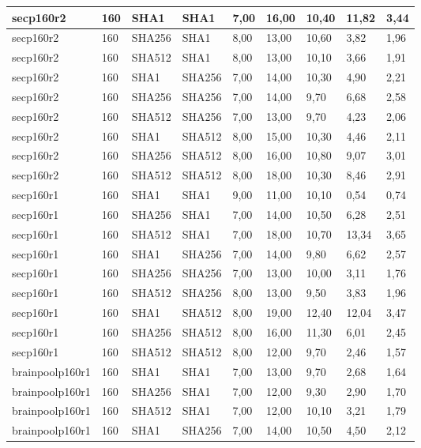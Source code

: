 \begin{longtable}{| l | l | l | l | l |l |l |l |l |}
secp160r2 & 160 & SHA1 & SHA1 & 7,00 & 16,00 & 10,40 & 11,82 & 3,44 \\ \hline 
secp160r2 & 160 & SHA256 & SHA1 & 8,00 & 13,00 & 10,60 & 3,82 & 1,96 \\ \hline 
secp160r2 & 160 & SHA512 & SHA1 & 8,00 & 13,00 & 10,10 & 3,66 & 1,91 \\ \hline 
secp160r2 & 160 & SHA1 & SHA256 & 7,00 & 14,00 & 10,30 & 4,90 & 2,21 \\ \hline 
secp160r2 & 160 & SHA256 & SHA256 & 7,00 & 14,00 & 9,70 & 6,68 & 2,58 \\ \hline 
secp160r2 & 160 & SHA512 & SHA256 & 7,00 & 13,00 & 9,70 & 4,23 & 2,06 \\ \hline 
secp160r2 & 160 & SHA1 & SHA512 & 8,00 & 15,00 & 10,30 & 4,46 & 2,11 \\ \hline 
secp160r2 & 160 & SHA256 & SHA512 & 8,00 & 16,00 & 10,80 & 9,07 & 3,01 \\ \hline 
secp160r2 & 160 & SHA512 & SHA512 & 8,00 & 18,00 & 10,30 & 8,46 & 2,91 \\ \hline 
secp160r1 & 160 & SHA1 & SHA1 & 9,00 & 11,00 & 10,10 & 0,54 & 0,74 \\ \hline 
secp160r1 & 160 & SHA256 & SHA1 & 7,00 & 14,00 & 10,50 & 6,28 & 2,51 \\ \hline 
secp160r1 & 160 & SHA512 & SHA1 & 7,00 & 18,00 & 10,70 & 13,34 & 3,65 \\ \hline 
secp160r1 & 160 & SHA1 & SHA256 & 7,00 & 14,00 & 9,80 & 6,62 & 2,57 \\ \hline 
secp160r1 & 160 & SHA256 & SHA256 & 7,00 & 13,00 & 10,00 & 3,11 & 1,76 \\ \hline 
secp160r1 & 160 & SHA512 & SHA256 & 8,00 & 13,00 & 9,50 & 3,83 & 1,96 \\ \hline 
secp160r1 & 160 & SHA1 & SHA512 & 8,00 & 19,00 & 12,40 & 12,04 & 3,47 \\ \hline 
secp160r1 & 160 & SHA256 & SHA512 & 8,00 & 16,00 & 11,30 & 6,01 & 2,45 \\ \hline 
secp160r1 & 160 & SHA512 & SHA512 & 8,00 & 12,00 & 9,70 & 2,46 & 1,57 \\ \hline 
brainpoolp160r1 & 160 & SHA1 & SHA1 & 7,00 & 13,00 & 9,70 & 2,68 & 1,64 \\ \hline 
brainpoolp160r1 & 160 & SHA256 & SHA1 & 7,00 & 12,00 & 9,30 & 2,90 & 1,70 \\ \hline 
brainpoolp160r1 & 160 & SHA512 & SHA1 & 7,00 & 12,00 & 10,10 & 3,21 & 1,79 \\ \hline 
brainpoolp160r1 & 160 & SHA1 & SHA256 & 7,00 & 14,00 & 10,50 & 4,50 & 2,12 \\ \hline 

\end{longtable}
